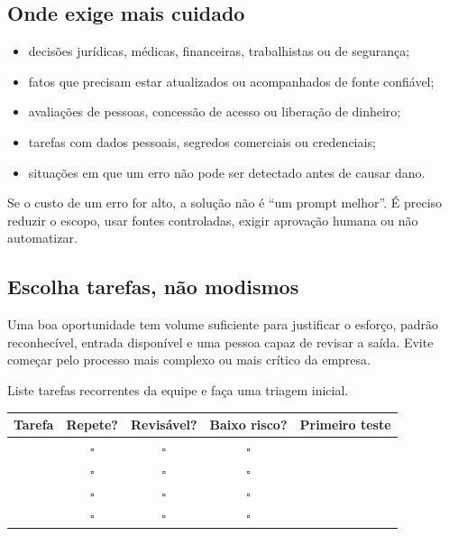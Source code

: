 \documentclass[11pt,a4paper]{article}
\begin{document}
\subsection{Onde exige mais cuidado}

\begin{itemize}
  \item decisões jurídicas, médicas, financeiras, trabalhistas ou de segurança;
  \item fatos que precisam estar atualizados ou acompanhados de fonte confiável;
  \item avaliações de pessoas, concessão de acesso ou liberação de dinheiro;
  \item tarefas com dados pessoais, segredos comerciais ou credenciais;
  \item situações em que um erro não pode ser detectado antes de causar dano.
\end{itemize}

\begin{alerta}
Se o custo de um erro for alto, a solução não é “um prompt melhor”. É preciso reduzir o escopo, usar fontes controladas, exigir aprovação humana ou não automatizar.
\end{alerta}

\newpage
\subsection{Escolha tarefas, não modismos}

Uma boa oportunidade tem volume suficiente para justificar o esforço, padrão reconhecível, entrada disponível e uma pessoa capaz de revisar a saída. Evite começar pelo processo mais complexo ou mais crítico da empresa.

\begin{atividade}
Liste tarefas recorrentes da equipe e faça uma triagem inicial.

\begin{tabularx}{\linewidth}{p{43mm} c c c X}
\toprule
Tarefa & Repete? & Revisável? & Baixo risco? & Primeiro teste \\
\midrule
\rule{0pt}{7mm} & $\square$ & $\square$ & $\square$ & \\
\rule{0pt}{7mm} & $\square$ & $\square$ & $\square$ & \\
\rule{0pt}{7mm} & $\square$ & $\square$ & $\square$ & \\
\rule{0pt}{7mm} & $\square$ & $\square$ & $\square$ & \\
\bottomrule
\end{tabularx}
\end{atividade}
\end{document}
